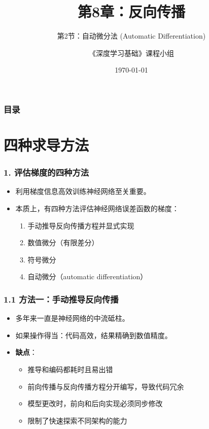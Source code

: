 \documentclass[t,aspectratio=169]{beamer} %
\title[8.2.自动微分]{第8章：反向传播}
\subtitle{第2节：自动微分法 (Automatic Differentiation)}
\author{《深度学习基础》课程小组}
\date{\today}
\begin{document}
\frame{\titlepage}

\begin{frame}
    \frametitle{目录}
    \tableofcontents
\end{frame}

\section{四种求导方法}

\begin{frame}
    \frametitle{1. 评估梯度的四种方法}
    \begin{itemize}
        \item 利用梯度信息高效训练神经网络至关重要。
        \item 本质上，有\alert{四种方法}评估神经网络误差函数的梯度：
        \begin{enumerate}
            \item 手动推导反向传播方程并显式实现
            \item 数值微分（有限差分）
            \item 符号微分
            \item \alert{自动微分}（automatic differentiation）
        \end{enumerate}
    \end{itemize}
\end{frame}

\begin{frame}
    \frametitle{1.1 方法一：手动推导反向传播}
    \begin{itemize}
        \item 多年来一直是神经网络的\alert{中流砥柱}。
        \item 如果操作得当：代码高效，结果精确到数值精度。
        \item \textbf{缺点}：
        \begin{itemize}
            \item 推导和编码都\alert{耗时且易出错}
            \item 前向传播与反向传播方程\alert{分开编写}，导致代码冗余
            \item 模型更改时，前向和后向实现必须\alert{同步修改}
            \item 限制了快速探索不同架构的能力
        \end{itemize}
    \end{itemize}
\end{frame}
\end{document}

